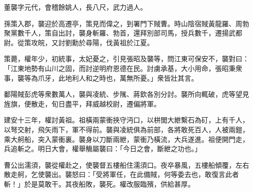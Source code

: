 \begin{pinyinscope}
 
 
 董襲字元代，會稽餘姚人，長八尺，武力過人。
 
 
 孫策入郡，襲迎於高遷亭，策見而偉之，到署門下賊曹。時山陰宿賊黃龍羅、周勃聚黨數千人，策自出討，襲身斬羅、勃首，還拜別部司馬，授兵數千，遷揚武都尉。從策攻皖，又討劉勳於尋陽，伐黃祖於江夏。
 
 
 
 
 策薨，權年少，初統事，太妃憂之，引見張昭及襲等，問江東可保安不，襲對曰：「江東地勢有山川之固，而討逆明府恩德在民。討虜承基，大小用命，張昭秉衆事，襲等為爪牙，此地利人和之時也，萬無所憂。」衆皆壯其言。
 
 
 
 
 鄱陽賊彭虎等衆數萬人，襲與凌統、步隲、蔣欽各別分討。襲所向輒破，虎等望見旌旗，便散走，旬日盡平，拜威越校尉，遷偏將軍。
 
 
 
 
 建安十三年，權討黃祖。祖橫兩蒙衝挾守沔口，以栟閭大紲繫石為矴，上有千人，以弩交射，飛矢雨下，軍不得前。襲與凌統俱為前部，各將敢死百人，人被兩鎧，乘大舸船，突入蒙衝裏。襲身以刀斷兩紲，蒙衝乃橫流，大兵遂進。祖便開門走，兵追斬之。明日大會，權舉觴屬襲曰：「今日之會，斷紲之功也。」
 
 
 
 
 曹公出濡須，襲從權赴之，使襲督五樓船住濡須口。夜卒暴風，五樓船傾覆，左右散走舸，乞使襲出。襲怒曰：「受將軍任，在此備賊，何等委去也，敢復言此者斬！」於是莫敢干。其夜船敗，襲死。權改服臨殯，供給甚厚。
 
 
\end{pinyinscope}